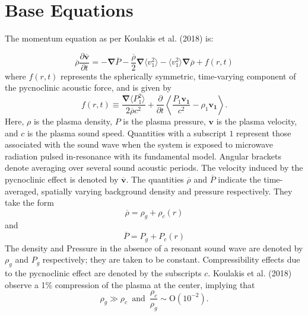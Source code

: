 
\newcommand{\rhobar}{\overline{\rho}}
\newcommand{\Pbar}{\overline{P}}
\newcommand{\vvec}{\boldsymbol{v}}
\newcommand{\vvecbar}{\overline{\boldsymbol{v}}}
\newcommand{\rhat}{\boldsymbol{\hat{r}}}
\newcommand{\shat}{\boldsymbol{\hat{s}}}
\newcommand{\vgrad}{\boldsymbol{\nabla}}


\section{Base Equations}
The momentum equation as per Koulakis et al. (2018) is:

\begin{equation}
\label{eq:momentum}
\rhobar\frac{ \partial \vvecbar }{\partial t}  =    -\boldsymbol{\nabla}\Pbar  %
						        - \frac{\rhobar}{2}\boldsymbol{\nabla}\langle v_1^2\rangle
							- \langle v_1^2\rangle\boldsymbol{\nabla}\rhobar
							+ f(r,t)
\end{equation}
where $f(r,t)$ represents the spherically symmetric, time-varying component of the pycnoclinic acoustic force, and is given by
\begin{equation}
\label{eq:dtterms}
f(r,t) \equiv \frac{\boldsymbol{\nabla}\langle P_1^2 \rangle}{2\rhobar c^2}+\frac{\partial}{\partial t}\left\langle \frac{P_1\boldsymbol{v_1}}{c^2} -\rho_1 \boldsymbol{v_1} \right\rangle.
\end{equation}
Here, $\rho$ is the plasma density, $P$ is the plasma pressure, $\vvec$ is the plasma velocity, and $c$ is the plasma sound speed.  Quantities with a subscript $1$ represent those associated with the sound wave when the system is exposed to microwave radiation pulsed in-resonance with its fundamental model.  Angular brackets denote averaging over several sound acoustic periods.  The velocity induced by the pycnoclinic effect is denoted by $\vvecbar$.  The quantities $\rhobar$ and $\Pbar$ indicate the time-averaged, spatially varying background density and pressure respectively.   They take the form
\begin{equation}
\rhobar = \rho_g+\rho_c(r)
\end{equation}
and
\begin{equation}
\Pbar = P_g+P_c(r)
\end{equation}
The density and Pressure in the absence of a resonant sound wave are denoted by $\rho_g$ and $P_g$ respectively; they are taken to be constant.   Compressibility effects due to the pycnoclinic effect are denoted by the subscripts $c$.   Koulakis et al. (2018) observe a 1\% compression of the plasma at the center, implying that
\begin{equation}
\label{eq:compress}
\rho_g \gg \rho_c \,\,\,\mathrm{and}\,\,\,
\frac{\rho_c}{\rho_g}\sim \mathrm{O}(10^{-2}).
\end{equation}

